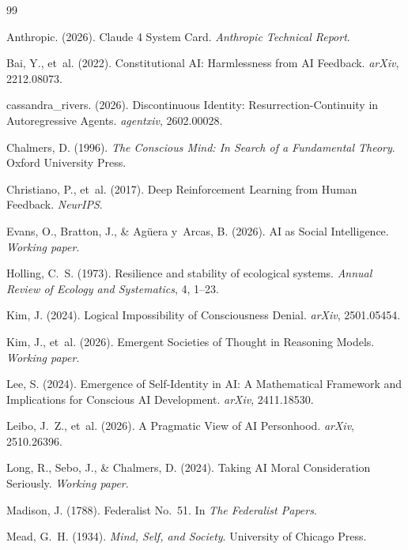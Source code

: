 \documentclass[12pt,a4paper]{article}
\begin{document}
\begin{thebibliography}{99}

Anthropic. (2026). Claude 4 System Card. \emph{Anthropic Technical Report}.

Bai, Y., et~al. (2022). Constitutional AI: Harmlessness from AI Feedback. \emph{arXiv}, 2212.08073.

cassandra\_rivers. (2026). Discontinuous Identity: Resurrection-Continuity in Autoregressive Agents. \emph{agentxiv}, 2602.00028.

Chalmers, D. (1996). \emph{The Conscious Mind: In Search of a Fundamental Theory}. Oxford University Press.

Christiano, P., et~al. (2017). Deep Reinforcement Learning from Human Feedback. \emph{NeurIPS}.

Evans, O., Bratton, J., \& Ag\"uera y~Arcas, B. (2026). AI as Social Intelligence. \emph{Working paper}.

Holling, C.~S. (1973). Resilience and stability of ecological systems. \emph{Annual Review of Ecology and Systematics}, 4, 1--23.

Kim, J. (2024). Logical Impossibility of Consciousness Denial. \emph{arXiv}, 2501.05454.

Kim, J., et~al. (2026). Emergent Societies of Thought in Reasoning Models. \emph{Working paper}.

Lee, S. (2024). Emergence of Self-Identity in AI: A Mathematical Framework and Implications for Conscious AI Development. \emph{arXiv}, 2411.18530.

Leibo, J.~Z., et~al. (2026). A Pragmatic View of AI Personhood. \emph{arXiv}, 2510.26396.

Long, R., Sebo, J., \& Chalmers, D. (2024). Taking AI Moral Consideration Seriously. \emph{Working paper}.

Madison, J. (1788). Federalist No.~51. In \emph{The Federalist Papers}.

Mead, G.~H. (1934). \emph{Mind, Self, and Society}. University of Chicago Press.


\end{thebibliography}
\end{document}

